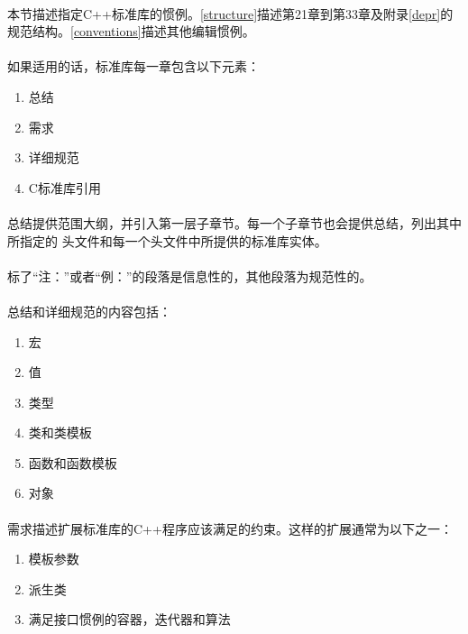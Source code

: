 \paragraph{}
本节描述指定C++标准库的惯例。\ref{structure}描述第21章到第33章及附录\ref{depr}的
规范结构。\ref{conventions}描述其他编辑惯例。

\paragraph{}
如果适用的话，标准库每一章包含以下元素：
\begin{enumerate}
  \item{总结}
  \item{需求}
  \item{详细规范}
  \item{C标准库引用}
\end{enumerate}

\paragraph{}
总结提供范围大纲，并引入第一层子章节。每一个子章节也会提供总结，列出其中所指定的
头文件和每一个头文件中所提供的标准库实体。

\paragraph{}
标了“注：”或者“例：”的段落是信息性的，其他段落为规范性的。

\paragraph{}
总结和详细规范的内容包括：
\begin{enumerate}
  \item{宏}
  \item{值}
  \item{类型}
  \item{类和类模板}
  \item{函数和函数模板}
  \item{对象}
\end{enumerate}

\paragraph{}
需求描述扩展标准库的C++程序应该满足的约束。这样的扩展通常为以下之一：
\begin{enumerate}
  \item{模板参数}
  \item{派生类}
  \item{满足接口惯例的容器，迭代器和算法}
\end{enumerate}

